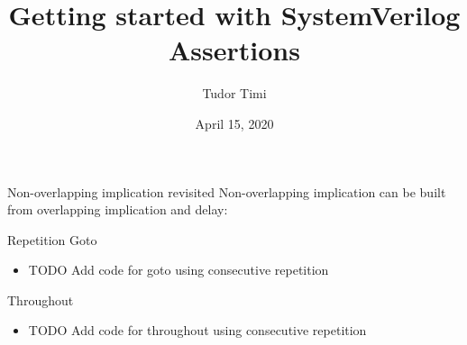 \documentclass{beamer}
\title{Getting started with SystemVerilog Assertions}
\author{Tudor Timi}
\institute{VerificationGentleman.com}
\date{April 15, 2020}
\begin{document}
\begin{frame}[fragile]{Non-overlapping implication revisited}
Non-overlapping implication can be built from overlapping implication and delay:

\pause
{}

\pause
{}

\pause
{}
\end{frame}


\begin{frame}{Repetition}
Goto

\begin{itemize}
 \item TODO Add code for goto using consecutive repetition
\end{itemize}
\end{frame}


\begin{frame}{Throughout}
\begin{itemize}
 \item TODO Add code for throughout using consecutive repetition
\end{itemize}
\end{frame}
\end{document}
